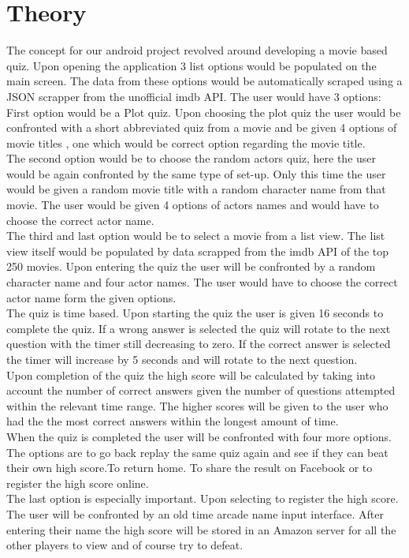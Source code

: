 \documentclass{article}
\begin{document}
\section{Theory}\label{sec:theory}
The concept for our android project revolved around developing a movie based quiz.
Upon opening the application 3 list options would be populated on the main screen. The data from these options would be automatically scraped using a JSON scrapper from the unofficial imdb API. 
The user would have 3 options:
First option would be a Plot quiz. Upon choosing the plot quiz the user would be confronted with a short abbreviated quiz from a movie and be given 4 options of movie titles , one which would be correct option regarding the movie title.\\
The second option would be to choose the random actors quiz, here the user would be again confronted by the same type of set-up. Only this time the user would be given a random movie title with a random character name from that movie. The user would be given 4 options of actors names and would have to choose the correct actor name.\\
The third and last option would be to select a movie from a list view. The list view itself would be populated by data scrapped from the imdb API of the top 250 movies. Upon entering the quiz the user will be confronted by a random character name and four actor names. The user would have to choose the correct actor name form the given options. \\
The quiz is time based. Upon starting the quiz the user is given 16 seconds to complete the quiz. If a wrong answer is selected the quiz will rotate to the next question with the timer still decreasing to zero. If the correct answer is selected the timer will increase by 5 seconds and  will rotate to the next question. \\
Upon completion of the quiz the high score will be calculated by taking into account the number of correct answers given the number of questions attempted within the relevant time range. The higher scores will be given to the user who had the the most correct answers within the longest amount of time.\\
When the quiz is completed the user will be confronted with four more options. The options are to go back replay the same quiz again and see if they can beat their own high score.To return home. To share the result on Facebook or to register the high score online.\\
The last option is especially important. Upon selecting to register the high score. The user will be confronted by an old time arcade name input interface. After entering their name the high score will be stored in an Amazon server for all the other players to view and of course try to defeat.\\
\end{document}
